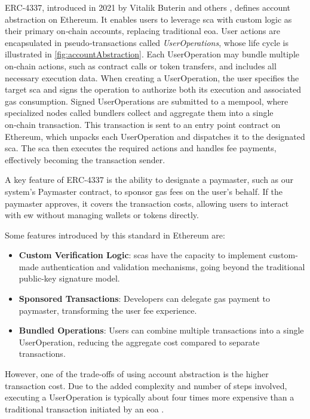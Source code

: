 ERC‑4337, introduced in 2021 by Vitalik Buterin and others \cite{buterin2021erc}\cite{lin2024accountabstraction}, defines account abstraction on Ethereum. It enables users to leverage \gls{sca} with custom logic as their primary on‑chain accounts, replacing traditional \gls{eoa}. User actions are encapsulated in pseudo‑transactions called \textit{UserOperations}, whose life cycle is illustrated in \cref{fig:accountAbstraction}. Each UserOperation may bundle multiple on‑chain actions, such as contract calls or token transfers, and includes all necessary execution data. When creating a UserOperation, the user specifies the target \gls{sca} and signs the operation to authorize both its execution and associated gas consumption.
Signed UserOperations are submitted to a \gls{mempool}, where specialized nodes called bundlers collect and aggregate them into a single on‑chain transaction. This transaction is sent to an entry point contract on Ethereum, which unpacks each UserOperation and dispatches it to the designated \gls{sca}. The \gls{sca} then executes the required actions and handles fee payments, effectively becoming the transaction sender.

A key feature of ERC‑4337 is the ability to designate a paymaster, such as our system’s Paymaster contract, to sponsor gas fees on the user’s behalf. If the paymaster approves, it covers the transaction costs, allowing users to interact with \gls{ew} without managing wallets or tokens directly.

Some features introduced by this standard in Ethereum are:
\begin{itemize}
    \item \textbf{Custom Verification Logic}: \gls{sca}s have the capacity to implement custom-made authentication and validation mechanisms, going beyond the traditional public-key signature model.
    \item \textbf{Sponsored Transactions}: Developers can delegate gas payment to paymaster, transforming the user fee experience.
    \item \textbf{Bundled Operations}: Users can combine multiple transactions into a single UserOperation, reducing the aggregate cost compared to separate transactions.
\end{itemize}

However, one of the trade-offs of using account abstraction is the higher transaction cost. Due to the added complexity and number of steps involved, executing a UserOperation is typically about four times more expensive than a traditional transaction initiated by an \gls{eoa} \cite{lin2024accountabstraction}.

